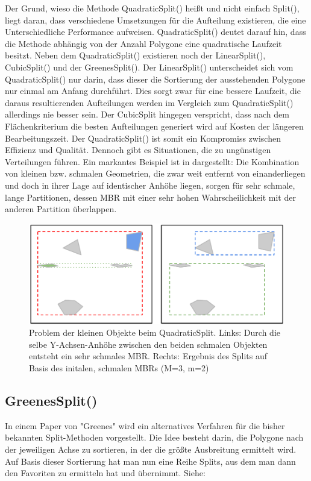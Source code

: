 \documentclass[runningheads,a4paper]{llncs}
\begin{document}
Der Grund, wieso die Methode QuadraticSplit() heißt und nicht einfach Split(), liegt daran, dass verschiedene Umsetzungen für die Aufteilung existieren, die eine Unterschiedliche Performance aufweisen. QuadraticSplit() deutet darauf hin, dass die Methode abhängig von der Anzahl Polygone eine quadratische Laufzeit besitzt. Neben dem QuadraticSplit() existieren noch der LinearSplit(), CubicSplit() und der GreenesSplit(). Der LinearSplit() unterscheidet sich vom QuadraticSplit() nur darin, dass dieser die Sortierung der ausstehenden Polygone nur einmal am Anfang durchführt. Dies sorgt zwar für eine bessere Laufzeit, die daraus resultierenden Aufteilungen werden im Vergleich zum QuadraticSplit() allerdings nie besser sein. Der CubicSplit hingegen verspricht, dass nach dem Flächenkriterium die besten Aufteilungen generiert wird auf Kosten der längeren Bearbeitungszeit. Der QuadraticSplit() ist somit ein Kompromiss zwischen Effizienz und Qualität. Dennoch gibt es Situationen, die zu ungünstigen Verteilungen führen. Ein markantes Beispiel ist in  dargestellt: Die Kombination von kleinen bzw. schmalen Geometrien, die zwar weit entfernt von einanderliegen und doch in ihrer Lage auf identischer Anhöhe liegen, sorgen für sehr schmale, lange Partitionen, dessen \acs{MBR} mit einer sehr hohen Wahrscheilichkeit mit der anderen Partition überlappen.
\begin{figure}[H]
		\begin{center}
		\includegraphics[width=1.0\textwidth ]{004_Problem_Kleine_Objekte.pdf}
		\caption{Problem der kleinen Objekte beim QuadraticSplit. Links: Durch die selbe Y-Achsen-Anhöhe zwischen den beiden schmalen Objekten entsteht ein sehr schmales \acs{MBR}. Rechts: Ergebnis des Splits auf Basis des initalen, schmalen \acs{MBR}s (\acs{M}=3, \acs{m}=2)}
		\label{fig:problem-tiny-object}
		\end{center}
	\end{figure} 

\subsection{GreenesSplit()}
In einem Paper von "Greenes" wird ein alternatives Verfahren für die bisher bekannten Split-Methoden vorgestellt. Die Idee besteht darin, die Polygone nach der jeweiligen Achse zu sortieren, in der die größte Ausbreitung ermittelt wird. Auf Basis dieser Sortierung hat man nun eine Reihe Splits, aus dem man dann den Favoriten zu ermitteln hat und übernimmt. Siehe: 
\end{document}
